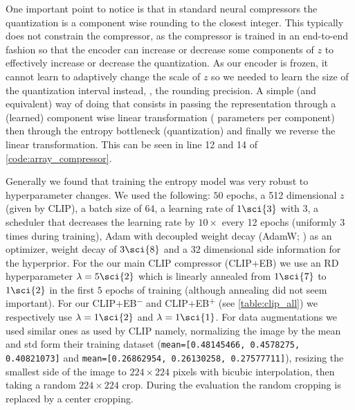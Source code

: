 \documentclass[final]{article}
\begin{document}
One important point to notice is that in standard neural compressors the quantization is  a component wise rounding to the closest integer.
This typically does not constrain the compressor, as the compressor is trained in an end-to-end fashion so that the encoder can increase or decrease some components of $z$ to effectively increase or decrease the quantization.
As our encoder is frozen, it cannot learn to adaptively change the scale of $z$ so we needed to learn the size of the quantization interval instead, \ie, the rounding precision.
A simple (and equivalent) way of doing that consists in passing the representation through a (learned) component wise linear transformation ( parameters per component) then through the entropy bottleneck (quantization) and finally we reverse the linear transformation.
This can be seen in line 12 and 14 of \cref{code:array_compressor}.

Generally we found that training the entropy model was very robust to hyperparameter changes. 
We used the following: $50$ epochs, a 512 dimensional $z$ (given by CLIP), a batch size of $64$, a learning rate of $1\sci{3}$ with 3, a  scheduler that decreases the learning rate by $10\times$ every 12 epochs (\ie uniformly 3 times during training), Adam with decoupled weight decay (AdamW; \cite{loshchilov_decoupled_2019}) as an optimizer, weight decay of $3\sci{8}$ and a $32$ dimensional side information for the hyperprior.
For the our main CLIP compressor (CLIP+EB) we use an RD hyperparameter $\lambda = 5\sci{2}$ which is linearly annealed from $1\sci{7}$ to $1\sci{2}$ in the first $5$ epochs of training (although annealing did not seem important).
For our CLIP+EB\textsuperscript{$-$} and CLIP+EB\textsuperscript{$+$} (see \cref{table:clip_all}) we respectively use $\lambda=1\sci{2}$ and $\lambda=1\sci{1}$.
For data augmentations we used similar ones as used by CLIP namely, normalizing the image by the mean and std form their training dataset (\texttt{mean=[0.48145466, 0.4578275, 0.40821073]} and \texttt{mean=[0.26862954, 0.26130258, 0.27577711]}), resizing the smallest side of the image to $224\times224$ pixels with bicubic interpolation, then taking a random $224\times224$ crop.
During the evaluation the random cropping is replaced by a center cropping.
\end{document}
